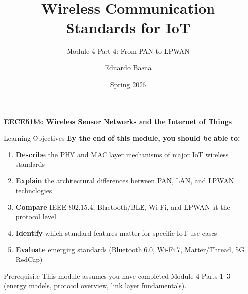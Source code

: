 \documentclass[aspectratio=169,11pt]{beamer}
\title[EECE5155 -- Module 4 Part 4]{Wireless Communication Standards for IoT}
\subtitle{Module 4 Part 4: From PAN to LPWAN}
\author{Eduardo Baena}
\date{Spring 2026}
\institute{Northeastern University\\Department of Electrical and Computer Engineering\\
\texttt{e.baena@northeastern.edu}}
\begin{document}
\begin{frame}
    \titlepage
    \vspace{-1cm}
    \begin{center}
        \textbf{EECE5155: Wireless Sensor Networks and the Internet of Things}
    \end{center}
\end{frame}

\begin{frame}{Learning Objectives}
    \textbf{By the end of this module, you should be able to:}
    
    \vspace{0.5cm}
    \begin{enumerate}
        \item \textbf{Describe} the PHY and MAC layer mechanisms of major IoT wireless standards
        \item \textbf{Explain} the architectural differences between PAN, LAN, and LPWAN technologies
        \item \textbf{Compare} IEEE 802.15.4, Bluetooth/BLE, Wi-Fi, and LPWAN at the protocol level
        \item \textbf{Identify} which standard features matter for specific IoT use cases
        \item \textbf{Evaluate} emerging standards (Bluetooth 6.0, Wi-Fi 7, Matter/Thread, 5G RedCap)
    \end{enumerate}
    
    \vspace{0.3cm}
    \begin{alertblock}{Prerequisite}
        This module assumes you have completed Module 4 Parts 1--3 (energy models, protocol overview, link layer fundamentals).
    \end{alertblock}
\end{frame}
\end{document}

